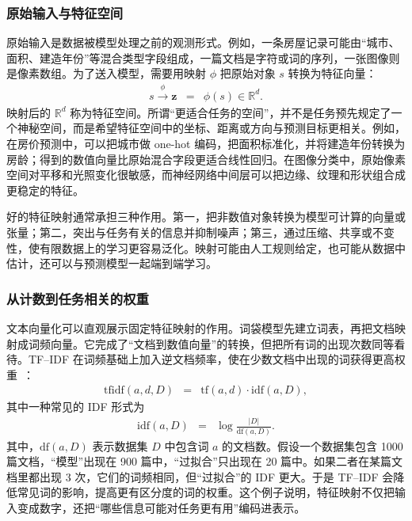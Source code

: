 \subsubsection{原始输入与特征空间}

原始输入是数据被模型处理之前的观测形式。例如，一条房屋记录可能由“城市、面积、建造年份”等混合类型字段组成，一篇文档是字符或词的序列，一张图像则是像素数组。为了送入模型，需要用映射 $\phi$ 把原始对象 $s$ 转换为特征向量：
\begin{eqnarray}
s
\xrightarrow{\ \phi\ }
\mathbf{z}
& = &
\phi(s)\in\mathbb{R}^{d}.
\end{eqnarray}
映射后的 $\mathbb{R}^{d}$ 称为特征空间。所谓“更适合任务的空间”，并不是任务预先规定了一个神秘空间，而是希望特征空间中的坐标、距离或方向与预测目标更相关。例如，在房价预测中，可以把城市做 one-hot 编码，把面积标准化，并将建造年份转换为房龄；得到的数值向量比原始混合字段更适合线性回归。在图像分类中，原始像素空间对平移和光照变化很敏感，而神经网络中间层可以把边缘、纹理和形状组合成更稳定的特征。

好的特征映射通常承担三种作用。第一，把非数值对象转换为模型可计算的向量或张量；第二，突出与任务有关的信息并抑制噪声；第三，通过压缩、共享或不变性，使有限数据上的学习更容易泛化。映射可能由人工规则给定，也可能从数据中估计，还可以与预测模型一起端到端学习。

\subsubsection{从计数到任务相关的权重}

文本向量化可以直观展示固定特征映射的作用。词袋模型先建立词表，再把文档映射成词频向量。它完成了“文档到数值向量”的转换，但把所有词的出现次数同等看待。TF--IDF 在词频基础上加入逆文档频率，使在少数文档中出现的词获得更高权重~\cite{ManningEtAl2008IR}：
\begin{eqnarray}
\mathrm{tfidf}(a,d,D)
& = &
\mathrm{tf}(a,d)\cdot\mathrm{idf}(a,D),
\end{eqnarray}
\noindent 其中一种常见的 IDF 形式为
\begin{eqnarray}
\mathrm{idf}(a,D)
& = &
\log
\frac{|D|}{\mathrm{df}(a,D)}.
\end{eqnarray}
其中，$\mathrm{df}(a,D)$ 表示数据集 $D$ 中包含词 $a$ 的文档数。假设一个数据集包含 1000 篇文档，“模型”出现在 900 篇中，“过拟合”只出现在 20 篇中。如果二者在某篇文档里都出现 3 次，它们的词频相同，但“过拟合”的 IDF 更大。于是 TF--IDF 会降低常见词的影响，提高更有区分度的词的权重。这个例子说明，特征映射不仅把输入变成数字，还把“哪些信息可能对任务更有用”编码进表示。

